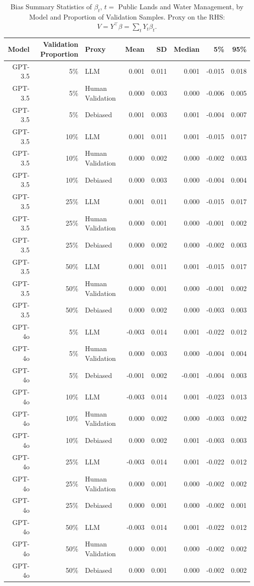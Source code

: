 \begin{table}

\caption{Bias Summary Statistics of $\beta_{t}$, $t=$ Public Lands and Water Management, by Model and Proportion of Validation Samples.
      Proxy on the RHS: $V = Y^\top \beta = \sum_{t} Y_t \beta_t$.}
\centering
\begin{tabular}[t]{rrlrrrrr}
\toprule
Model & Validation Proportion & Proxy & Mean & SD & Median & 5\% & 95\%\\
\midrule
GPT-3.5 & 5\% & LLM & 0.001 & 0.011 & 0.001 & -0.015 & 0.018\\
GPT-3.5 & 5\% & Human Validation & 0.000 & 0.003 & 0.000 & -0.006 & 0.005\\
GPT-3.5 & 5\% & Debiased & 0.001 & 0.003 & 0.001 & -0.004 & 0.007\\
GPT-3.5 & 10\% & LLM & 0.001 & 0.011 & 0.001 & -0.015 & 0.017\\
GPT-3.5 & 10\% & Human Validation & 0.000 & 0.002 & 0.000 & -0.002 & 0.003\\
GPT-3.5 & 10\% & Debiased & 0.000 & 0.003 & 0.000 & -0.004 & 0.004\\
GPT-3.5 & 25\% & LLM & 0.001 & 0.011 & 0.000 & -0.015 & 0.017\\
GPT-3.5 & 25\% & Human Validation & 0.000 & 0.001 & 0.000 & -0.001 & 0.002\\
GPT-3.5 & 25\% & Debiased & 0.000 & 0.002 & 0.000 & -0.002 & 0.003\\
GPT-3.5 & 50\% & LLM & 0.001 & 0.011 & 0.001 & -0.015 & 0.017\\
GPT-3.5 & 50\% & Human Validation & 0.000 & 0.001 & 0.000 & -0.001 & 0.002\\
GPT-3.5 & 50\% & Debiased & 0.000 & 0.002 & 0.000 & -0.003 & 0.003\\
GPT-4o & 5\% & LLM & -0.003 & 0.014 & 0.001 & -0.022 & 0.012\\
GPT-4o & 5\% & Human Validation & 0.000 & 0.003 & 0.000 & -0.004 & 0.004\\
GPT-4o & 5\% & Debiased & -0.001 & 0.002 & -0.001 & -0.004 & 0.003\\
GPT-4o & 10\% & LLM & -0.003 & 0.014 & 0.001 & -0.023 & 0.013\\
GPT-4o & 10\% & Human Validation & 0.000 & 0.002 & 0.000 & -0.003 & 0.002\\
GPT-4o & 10\% & Debiased & 0.000 & 0.002 & 0.001 & -0.003 & 0.003\\
GPT-4o & 25\% & LLM & -0.003 & 0.014 & 0.001 & -0.022 & 0.012\\
GPT-4o & 25\% & Human Validation & 0.000 & 0.001 & 0.000 & -0.002 & 0.002\\
GPT-4o & 25\% & Debiased & 0.000 & 0.001 & 0.000 & -0.002 & 0.001\\
GPT-4o & 50\% & LLM & -0.003 & 0.014 & 0.001 & -0.022 & 0.012\\
GPT-4o & 50\% & Human Validation & 0.000 & 0.001 & 0.000 & -0.002 & 0.002\\
GPT-4o & 50\% & Debiased & 0.000 & 0.001 & 0.000 & -0.002 & 0.002\\
\bottomrule
\end{tabular}
\end{table}
